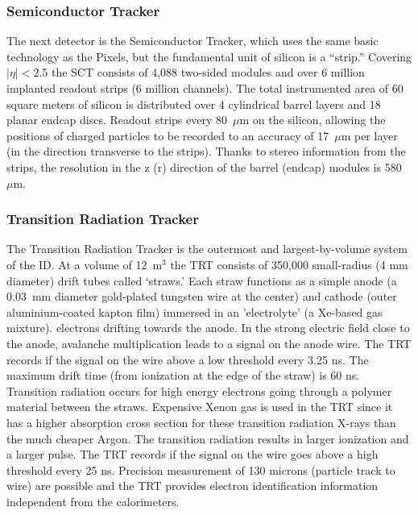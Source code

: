 \subsubsection{Semiconductor Tracker} \label{sec:sct}
The next detector is the Semiconductor Tracker, which uses the same basic technology as the Pixels, but the fundamental unit of silicon is a ``strip.''
Covering $|\eta|<$2.5 the SCT consists of 4,088 two-sided modules and over 6 million implanted readout strips (6 million channels).
The total instrumented area of 60 square meters of silicon is distributed over 4 cylindrical barrel layers and 18 planar endcap discs.
Readout strips every 80~$\mu$m on the silicon, allowing the positions of charged particles to be recorded to an accuracy of 17~$\mu$m per layer (in the direction transverse to the strips).
Thanks to stereo information from the strips, the resolution in the z (r) direction of the barrel (endcap) modules is 580~$\mu$m.

\subsubsection{Transition Radiation Tracker} \label{sec:trt}
The Transition Radiation Tracker is the outermost and largest-by-volume system of the ID.
At a volume of 12~$\text{m}^3$ the TRT consists of 350,000 small-radius (4 mm diameter) drift tubes called ‘straws.’ Each straw functions as a simple anode (a 0.03~mm diameter gold-plated tungsten wire at the center) and cathode (outer aluminium-coated kapton film) immersed in an 'electrolyte' (a Xe-based gas mixture).
electrons drifting towards the anode.
In the strong electric field close to the anode, avalanche multiplication leads to a signal on the anode wire.
The TRT records if the signal on the wire above a low threshold every 3.25 ns.
The maximum drift time (from ionization at the edge of the straw) is 60 ns.   Transition radiation occurs for high energy electrons going through a polymer material between the straws.
Expensive Xenon gas is used in the TRT since it has a higher absorption cross section for these transition radiation X-rays than the much cheaper Argon. 
The transition radiation results in larger ionization and a larger pulse. 
The TRT records if the signal on the wire goes above a high threshold every 25 ns.
Precision measurement of 130 microns (particle track to wire) are possible and the TRT provides electron identification information independent from the calorimeters.


